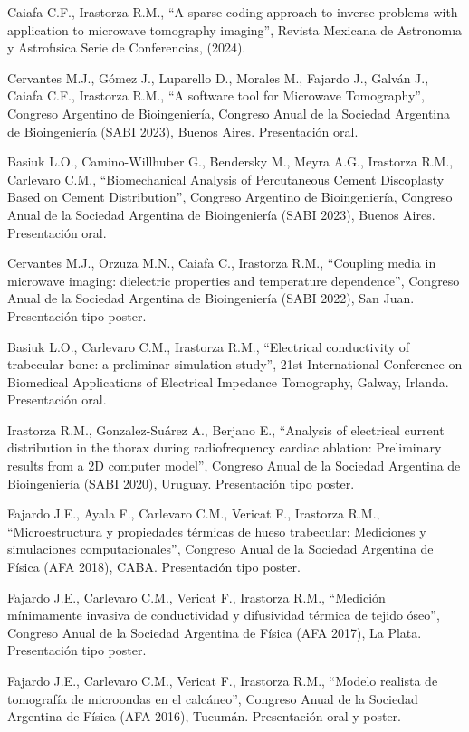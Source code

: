 \documentclass[margin,line]{res}
\begin{document}
\begin{resume}
Caiafa C.F., Irastorza R.M., ``A sparse coding approach to inverse problems with application to microwave tomography imaging'', Revista Mexicana de Astronomıa y Astrofısica Serie de Conferencias, (2024).

Cervantes M.J., Gómez J., Luparello D., Morales M., Fajardo J., Galván J., Caiafa C.F., Irastorza R.M., ``A software tool for Microwave Tomography'', Congreso Argentino de Bioingeniería,  Congreso Anual de la Sociedad Argentina de Bioingeniería (SABI 2023), Buenos Aires. Presentación oral.

Basiuk L.O., Camino-Willhuber G., Bendersky M., Meyra A.G., Irastorza R.M., Carlevaro C.M., ``Biomechanical Analysis of Percutaneous Cement Discoplasty Based on Cement Distribution'', Congreso Argentino de Bioingeniería,  Congreso Anual de la Sociedad Argentina de Bioingeniería (SABI 2023), Buenos Aires. Presentación oral.

Cervantes M.J., Orzuza M.N., Caiafa C., Irastorza R.M., ``Coupling media in microwave imaging: dielectric properties and temperature dependence'', Congreso Anual de la Sociedad Argentina de Bioingeniería (SABI 2022), San Juan. Presentación tipo poster.

Basiuk L.O., Carlevaro C.M., Irastorza R.M., ``Electrical conductivity of trabecular bone: a preliminar simulation study'', 21st International Conference on Biomedical Applications of Electrical Impedance Tomography, Galway, Irlanda. Presentación oral.

Irastorza R.M., Gonzalez-Suárez A., Berjano E., ``Analysis of electrical current distribution in the thorax during radiofrequency cardiac ablation: Preliminary results from a 2D computer model'', Congreso Anual de la Sociedad Argentina de Bioingeniería (SABI 2020), Uruguay. Presentación tipo poster.

Fajardo J.E., Ayala F., Carlevaro C.M., Vericat F., Irastorza R.M., ``Microestructura y propiedades térmicas de hueso trabecular: Mediciones y simulaciones computacionales'', Congreso Anual de la Sociedad Argentina de Física (AFA 2018), CABA. Presentación tipo poster.

Fajardo J.E., Carlevaro C.M., Vericat F., Irastorza R.M., ``Medición mínimamente invasiva de conductividad y difusividad térmica de tejido óseo'', Congreso Anual de la Sociedad Argentina de Física (AFA 2017), La Plata. Presentación tipo poster.

Fajardo J.E., Carlevaro C.M., Vericat F., Irastorza R.M., ``Modelo realista de tomografía de microondas en el calcáneo'', Congreso Anual de la Sociedad Argentina de Física (AFA 2016), Tucumán. Presentación oral y poster.


\end{resume}
\end{document}

